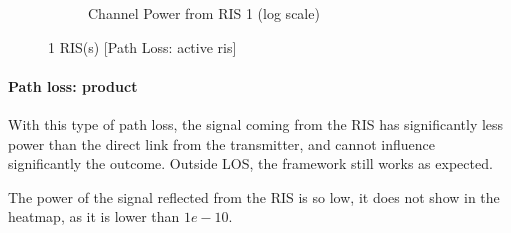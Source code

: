 \begin{figure}[H]
\begin{subfigure}[b]{0.48\textwidth}
    \caption{Channel Power from RIS 1 (log scale)}
  \end{subfigure}
  \caption{1 RIS(s) [Path Loss: active ris]}
\end{figure}

\paragraph*{Path loss: product}

With this type of path loss, the signal coming from the RIS has significantly less power than the direct link from the transmitter, and cannot influence significantly the outcome. Outside LOS, the framework still works as expected.

The power of the signal reflected from the RIS is so low, it does not show in the heatmap, as it is lower than $1e-10$.

